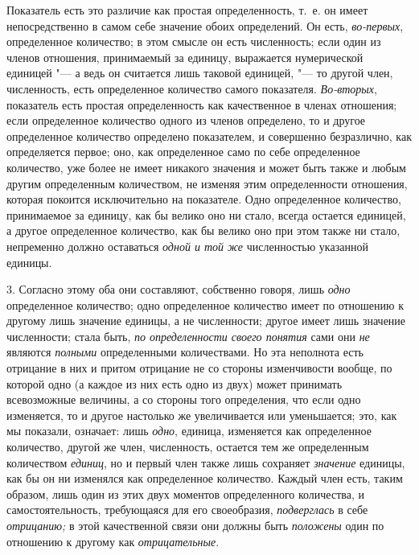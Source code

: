 Показатель есть это различие как простая определенность, т.~е. он имеет
непосредственно в самом себе значение обоих определений. Он есть,
{\em во-первых}, определенное количество; в этом смысле
он есть численность; если один из членов отношения, принимаемый за единицу,
выражается нумерической единицей "--- а ведь он считается лишь таковой
единицей, "--- то другой член, численность, есть определенное количество
самого показателя. {\em Во-вторых}, показатель есть
простая определенность как качественное в членах отношения; если
определенное количество одного из членов определено, то и другое
определенное количество определено показателем, и совершенно безразлично,
как определяется первое; оно, как определенное само по себе определенное
количество, уже более не имеет никакого значения и может быть также и любым
другим определенным количеством, не изменяя этим определенности отношения,
которая покоится исключительно на показателе. Одно определенное количество,
принимаемое за единицу, как бы велико оно ни стало, всегда остается
единицей, а другое определенное количество, как бы велико оно при этом
также ни стало, непременно должно оставаться {\em одной
и той же} численностью указанной единицы.

3. Согласно этому оба они составляют, собственно говоря, лишь
{\em одно} определенное количество; одно определенное
количество имеет по отношению к другому лишь значение единицы, а не
численности; другое имеет лишь значение численности; стала быть,
{\em по определенности своего понятия} сами они {\em не} являются {\em полными}
определенными количествами. Но эта неполнота есть отрицание в них и притом
отрицание не со стороны изменчивости вообще, по которой одно (а каждое из
них есть одно из двух) может принимать всевозможные величины, а со стороны
того определения, что если одно изменяется, то и другое настолько же
увеличивается или уменьшается; это, как мы показали, означает: лишь
{\em одно}, единица, изменяется как определенное
количество, другой же член, численность, остается тем же определенным
количеством {\em единиц}, но и первый член также лишь
сохраняет {\em значение} единицы, как бы он ни
изменялся как определенное количество. Каждый член есть, таким образом,
лишь один из этих двух моментов определенного количества, и
самостоятельность, требующаяся для его своеобразия, {\em подверглась} в себе
{\em отрицанию;} в этой качественной связи они должны
быть {\em положены} один по отношению к другому как {\em отрицательные}.

